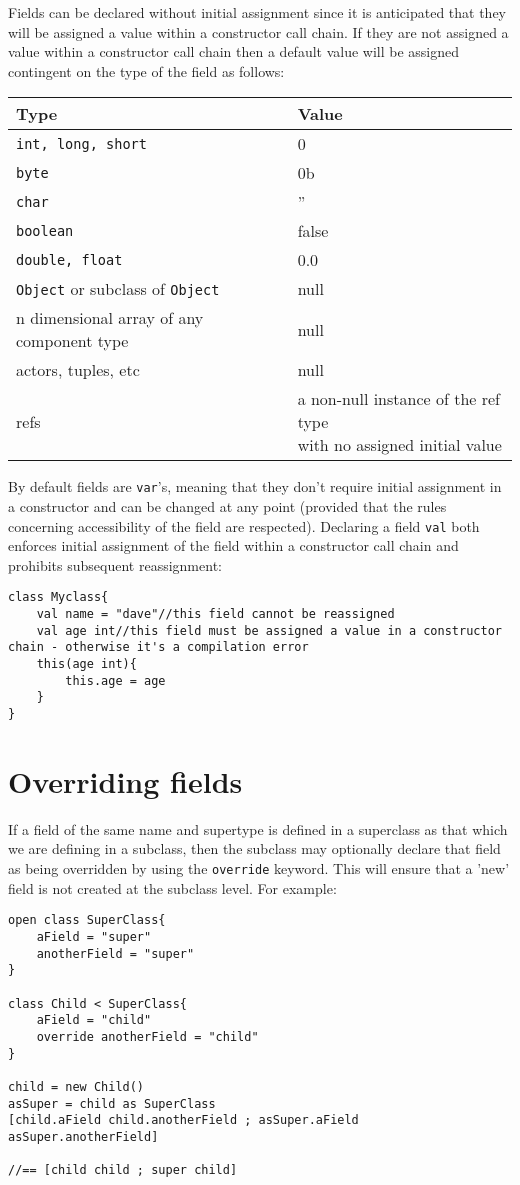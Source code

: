 \documentclass[conc-doc]{subfiles}
\begin{document}
Fields can be declared without initial assignment since it is anticipated that they will be assigned a value within a constructor call chain. If they are not assigned a value within a constructor call chain then a default value will be assigned contingent on the type of the field as follows:


\begin{table}[H]
	\centering
	\begin{tabular}{ll}
			\hline
			Type&Value\\
			\hline
			\lstinline!int, long, short!&0\\
			\lstinline!byte!&0b\\
			\lstinline!char!&''\\
			\lstinline!boolean!&false\\
			\lstinline!double, float!&0.0\\
			\lstinline!Object! or subclass of \lstinline!Object!&null\\
			n dimensional array of any component type&null\\
			actors, tuples, etc&null\\
			refs&\bettershortstack{a non-null instance of the ref type\\with no assigned initial value}\\
			\hline
	\end{tabular}%
\end{table}


By default fields are \lstinline{var}'s, meaning that they don't require initial assignment in a constructor and can be changed at any point (provided that the rules concerning accessibility of the field are respected). Declaring a field \lstinline{val} both enforces initial assignment of the field within a constructor call chain and prohibits subsequent reassignment:

\begin{lstlisting}
class Myclass{
	val name = "dave"//this field cannot be reassigned
	val age int//this field must be assigned a value in a constructor chain - otherwise it's a compilation error
	this(age int){
		this.age = age
	}
}
\end{lstlisting}

\section{Overriding fields}
If a field of the same name and supertype is defined in a superclass as that which we are defining in a subclass, then the subclass may optionally declare that field as being overridden by using the \lstinline{override} keyword. This will ensure that a 'new' field is not created at the subclass level. For example:
\begin{lstlisting}
open class SuperClass{
	aField = "super"
	anotherField = "super"
}

class Child < SuperClass{
	aField = "child"
	override anotherField = "child"
}

child = new Child()
asSuper = child as SuperClass
[child.aField child.anotherField ; asSuper.aField asSuper.anotherField]

//== [child child ; super child]
\end{lstlisting}
\end{document}

